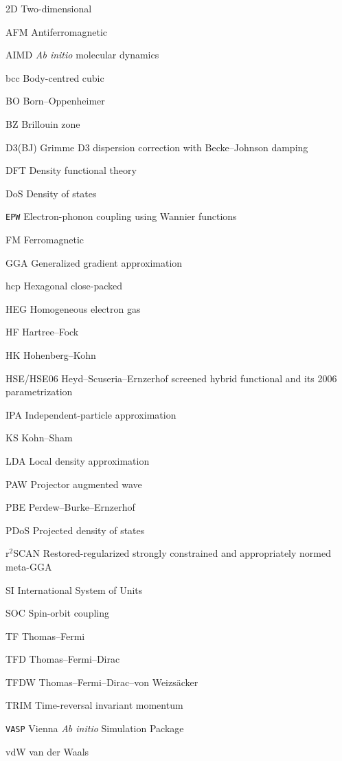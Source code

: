 
\singlespacing



\begin{thesisfrontmatterentries}
  \item[2D] Two-dimensional
  \item[AFM] Antiferromagnetic
  \item[AIMD] \textit{Ab initio} molecular dynamics
  \item[bcc] Body-centred cubic
  \item[BO] Born--Oppenheimer
  \item[BZ] Brillouin zone
  \item[D3(BJ)] Grimme D3 dispersion correction with Becke--Johnson damping
  \item[DFT] Density functional theory
  \item[DoS] Density of states
  \item[\texttt{EPW}] Electron-phonon coupling using Wannier functions
  \item[FM] Ferromagnetic
  \item[GGA] Generalized gradient approximation
  \item[hcp] Hexagonal close-packed
  \item[HEG] Homogeneous electron gas
  \item[HF] Hartree--Fock
  \item[HK] Hohenberg--Kohn
  \item[HSE/HSE06] Heyd--Scuseria--Ernzerhof screened hybrid functional and its 2006 parametrization
  \item[IPA] Independent-particle approximation
  \item[KS] Kohn--Sham
  \item[LDA] Local density approximation
  \item[PAW] Projector augmented wave
  \item[PBE] Perdew--Burke--Ernzerhof
  \item[PDoS] Projected density of states
  \item[\(\mathrm{r}^{2}\)SCAN] Restored-regularized strongly constrained and appropriately normed meta-GGA
  \item[SI] International System of Units
  \item[SOC] Spin-orbit coupling
  \item[TF] Thomas--Fermi
  \item[TFD] Thomas--Fermi--Dirac
  \item[TFDW] Thomas--Fermi--Dirac--von Weizs\"acker
  \item[TRIM] Time-reversal invariant momentum
  \item[\texttt{VASP}] Vienna \textit{Ab initio} Simulation Package
  \item[vdW] van der Waals
\end{thesisfrontmatterentries}


